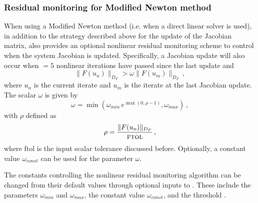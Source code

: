\subsubsection*{Residual monitoring for Modified Newton method}
When using a Modified Newton method (i.e. when a direct linear solver is 
used), in addition to the strategy described above for the update of the Jacobian 
matrix, {\kinsol} also provides an optional nonlinear residual monitoring
scheme to control when the system Jacobian is updated. Specifically, a Jacobian 
update will also occur when $=5$ nonlinear iterations have passed 
since the last update and
\[ \|F(u_n)\|_{D_F} > \omega \|F(u_m)\|_{D_F} \, , \]
where $u_n$ is the current iterate and $u_m$ is the iterate at the last Jacobian
update. The scalar $\omega$ is given by
\begin{equation}\label{resmon_omega}
\omega = \min \left (\omega_{min} \, e^{\max \left ( 0 , \rho - 1 \right )} , \omega_{max}\right ) \, ,
\end{equation}
with $\rho$ defined as
\begin{equation}
\rho = \frac{\|F(u_n) \|_{D_F}}{\mbox{{\sc ftol}}} \, ,
\end{equation}
where {\sc ftol} is the input scalar tolerance discussed before.
Optionally, a constant value $\omega_{const}$ can be used for the parameter $\omega$.


The constants controlling the nonlinear residual monitoring algorithm can
be changed from their default values through optional inputs to {\kinsol}.
These include the parameters $\omega_{min}$ and $\omega_{max}$, the constant 
value $\omega_{const}$, and the threshold .


